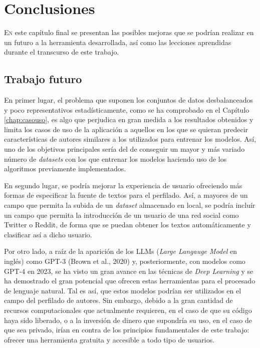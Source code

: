 \chapter{Conclusiones}
\label{chap:conclusiones}

\lettrine{E}{n} este capítulo final se presentan las posibles mejoras que se podrían realizar en un futuro a la herramienta desarrollada,
así como las lecciones aprendidas durante el transcurso de este trabajo.


\section{Trabajo futuro}
\label{sec:trabajo_futuro}

En primer lugar, el problema que suponen los conjuntos de datos desbalanceados y poco representativos estadísticamente, como se ha comprobado en el Capítulo \ref{chap:casouso},
es algo que perjudica en gran medida a los resultados obtenidos y limita los casos de uso de la aplicación a aquellos en los que se quieran predecir características
de autores similares a los utilizados para entrenar los modelos. Así, uno de los objetivos principales sería del de conseguir un mayor y más variado número de \textit{datasets}
con los que entrenar los modelos haciendo uso de los algoritmos previamente implementados.

\bigskip
En segundo lugar, se podría mejorar la experiencia de usuario ofreciendo más formas de especificar la fuente de textos para el perfilado.
Así, a mayores de un campo que permita la subida de un \textit{dataset} almacenado en local, se podría incluír un campo que permita la introducción
de un usuario de una red social como Twitter o Reddit, de forma que se puedan obtener los textos automáticamente y clasificar así a dicho usuario.

\bigskip
Por otro lado, a raíz de la aparición de los LLMs (\textit{Large Langauge Model} en inglés) como GPT-3 (Brown et al., 2020) \cite{brown2020language}
y, posteriormente, con modelos como GPT-4 en 2023, se ha visto un gran avance en las técnicas de \textit{Deep Learning}
y se ha demostrado el gran potencial que ofrecen estas herramientas para el procesado de lenguaje natural. Tal es así, que estos modelos
podrían ser utilizados en el campo del perfilado de autores. Sin embargo, debido a la gran cantidad de recursos
computacionales que actualmente requieren, en el caso de que su código haya sido liberado, o a la inversión de dinero que supondría su uso, en el caso
de que sea privado, irían en contra de los principios fundamentales de este trabajo: ofrecer una herramienta gratuita
y accesible a todo tipo de usuarios.

